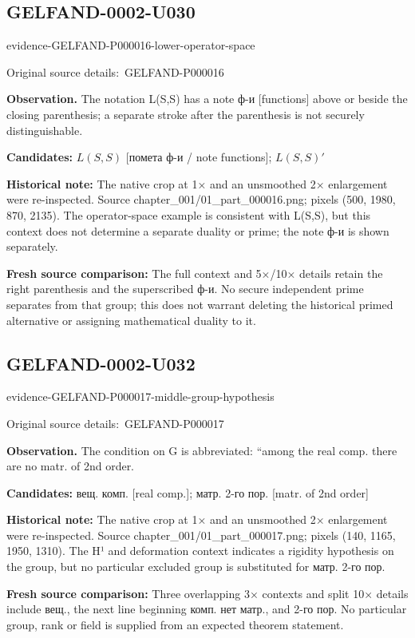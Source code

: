 \documentclass[11pt]{article}
\newcommand{\EvidenceBlock}[4]{%
 \par\smallskip\noindent\begin{minipage}{\linewidth}
 \begin{minipage}[t]{.47\linewidth}\vspace{0pt}\centering
 \csname evidence-#1-#2\endcsname\par
 {\scriptsize\SourceCropCaption\ #1}\par
 \end{minipage}\hfill
 \begin{minipage}[t]{.49\linewidth}\vspace{0pt}\raggedright
 {\small\color{orange!65!black}\textbf{#4} #3}\par
 \end{minipage}
 \end{minipage}\par\smallskip}
\newcommand{\SourceCropCaption}{Original source details:}\newcommand{\ReadingCaption}{Uncertain reading.}\newcommand{\IncompleteCaption}{Undeciphered passage.}\newcommand{\DiagramCaption}{Diagram and typed description.}
\begin{document}
\subsection*{GELFAND-0002-U030}
\EvidenceBlock{GELFAND-P000016}{lower-operator-space}{The notation L(S,S) has a note ф-и [functions] above or beside the closing parenthesis; a separate stroke after the parenthesis is not securely distinguishable.}{Observation.}
\par\smallskip\noindent\textbf{Candidates: } \(L(S,S)\) [помета ф-и / note functions]; \(L(S,S)'\)\par
\par\smallskip\noindent\textbf{Historical note: } The native crop at 1× and an unsmoothed 2× enlargement were re-inspected. Source chapter\_001/01\_part\_000016.png; pixels (500, 1980, 870, 2135). The operator-space example is consistent with L(S,S), but this context does not determine a separate duality or prime; the note ф-и is shown separately.\par
\par\smallskip\noindent\textbf{Fresh source comparison: } The full context and 5×/10× details retain the right parenthesis and the superscribed ф-и. No secure independent prime separates from that group; this does not warrant deleting the historical primed alternative or assigning mathematical duality to it.\par

\subsection*{GELFAND-0002-U032}
\EvidenceBlock{GELFAND-P000017}{middle-group-hypothesis}{The condition on G is abbreviated: ``among the real comp. there are no matr. of 2nd order.}{Observation.}
\par\smallskip\noindent\textbf{Candidates: } вещ. комп. [real comp.]; матр. 2-го пор. [matr. of 2nd order]\par
\par\smallskip\noindent\textbf{Historical note: } The native crop at 1× and an unsmoothed 2× enlargement were re-inspected. Source chapter\_001/01\_part\_000017.png; pixels (140, 1165, 1950, 1310). The H¹ and deformation context indicates a rigidity hypothesis on the group, but no particular excluded group is substituted for матр. 2-го пор.\par
\par\smallskip\noindent\textbf{Fresh source comparison: } Three overlapping 3× contexts and split 10× details include вещ., the next line beginning комп. нет матр., and 2-го пор. No particular group, rank or field is supplied from an expected theorem statement.\par
\end{document}
